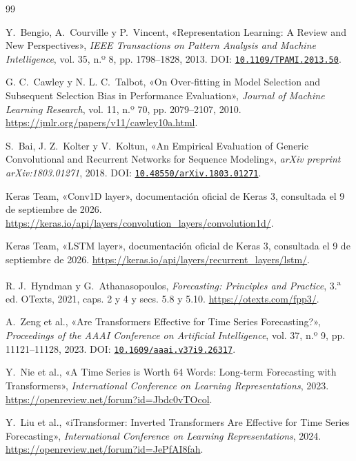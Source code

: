 \documentclass[11pt,letterpaper]{article}
\begin{document}
\begin{thebibliography}{99}
\small
\setlength{\itemsep}{0.35em}
\setlength{\parsep}{0pt}

Y.~Bengio, A.~Courville y P.~Vincent, «Representation Learning: A Review and New Perspectives», \emph{IEEE Transactions on Pattern Analysis and Machine Intelligence}, vol. 35, n.º 8, pp. 1798--1828, 2013. DOI: \href{https://doi.org/10.1109/TPAMI.2013.50}{\nolinkurl{10.1109/TPAMI.2013.50}}.

G. C.~Cawley y N. L. C.~Talbot, «On Over-fitting in Model Selection and Subsequent Selection Bias in Performance Evaluation», \emph{Journal of Machine Learning Research}, vol. 11, n.º 70, pp. 2079--2107, 2010. \url{https://jmlr.org/papers/v11/cawley10a.html}.

S.~Bai, J. Z.~Kolter y V.~Koltun, «An Empirical Evaluation of Generic Convolutional and Recurrent Networks for Sequence Modeling», \emph{arXiv preprint arXiv:1803.01271}, 2018. DOI: \href{https://doi.org/10.48550/arXiv.1803.01271}{\nolinkurl{10.48550/arXiv.1803.01271}}.

Keras Team, «Conv1D layer», documentación oficial de Keras 3, consultada el 9 de septiembre de 2026. \url{https://keras.io/api/layers/convolution_layers/convolution1d/}.

Keras Team, «LSTM layer», documentación oficial de Keras 3, consultada el 9 de septiembre de 2026. \url{https://keras.io/api/layers/recurrent_layers/lstm/}.

R. J.~Hyndman y G.~Athanasopoulos, \emph{Forecasting: Principles and Practice}, 3.\textsuperscript{a} ed. OTexts, 2021, caps. 2 y 4 y secs. 5.8 y 5.10. \url{https://otexts.com/fpp3/}.

A.~Zeng et al., «Are Transformers Effective for Time Series Forecasting?», \emph{Proceedings of the AAAI Conference on Artificial Intelligence}, vol. 37, n.º 9, pp. 11121--11128, 2023. DOI: \href{https://doi.org/10.1609/aaai.v37i9.26317}{\nolinkurl{10.1609/aaai.v37i9.26317}}.

Y.~Nie et al., «A Time Series is Worth 64 Words: Long-term Forecasting with Transformers», \emph{International Conference on Learning Representations}, 2023. \url{https://openreview.net/forum?id=Jbdc0vTOcol}.

Y.~Liu et al., «{iTransformer}: Inverted Transformers Are Effective for Time Series Forecasting», \emph{International Conference on Learning Representations}, 2024. \url{https://openreview.net/forum?id=JePfAI8fah}.


\end{thebibliography}
\end{document}
